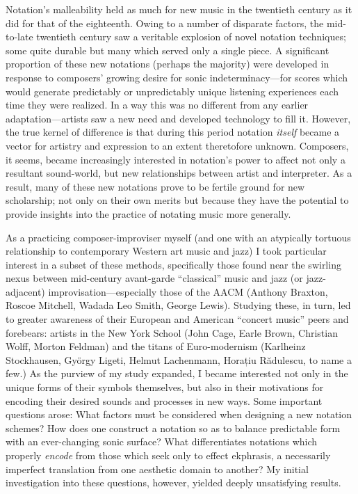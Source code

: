 Notation's malleability held as much for new music in the twentieth century as it did for that of the eighteenth. 
Owing to a number of disparate factors, the mid-to-late twentieth century saw a veritable explosion of novel notation techniques; some quite durable but many which served only a single piece.
A significant proportion of these new notations (perhaps the majority) were developed in response to composers' growing desire for sonic indeterminacy---for scores which would generate predictably or unpredictably unique listening experiences each time they were realized. 
In a way this was no different from any earlier adaptation---artists saw a new need and developed technology to fill it.
However, the true kernel of difference is that during this period notation \textit{itself} became a vector for artistry and expression to an extent theretofore unknown.
Composers, it seems, became increasingly interested in notation's power to affect not only a resultant sound-world, but new relationships between artist and interpreter.
As a result, many of these new notations prove to be fertile ground for new scholarship; not only on their own merits but because they have the potential to provide insights into the practice of notating music more generally. 

As a practicing composer-improviser myself (and one with an atypically tortuous relationship to contemporary Western art music and jazz) I took particular interest in a subset of these methods, specifically those found near the swirling nexus between mid-century avant-garde ``classical'' music and jazz (or jazz-adjacent) improvisation---especially those of the AACM (Anthony Braxton, Roscoe Mitchell, Wadada Leo Smith, George Lewis).
Studying these, in turn, led to greater awareness of their European and American ``concert music'' peers and forebears: artists in the New York School (John Cage, Earle Brown, Christian Wolff, Morton Feldman) and the titans of Euro-modernism (Karlheinz Stockhausen, Gy\"orgy Ligeti, Helmut Lachenmann, Horațiu R\u{a}dulescu, to name a few.)
As the purview of my study expanded, I became interested not only in the unique forms of their symbols themselves, but also in their motivations for encoding their desired sounds and processes in new ways.
Some important questions arose: What factors must be considered when designing a new notation schemes? 
How does one construct a notation so as to balance predictable form with an ever-changing sonic surface?
What differentiates notations which properly \textit{encode} from those which seek only to effect ekphrasis, a necessarily imperfect translation from one aesthetic domain to another? 
My initial investigation into these questions, however, yielded deeply unsatisfying results. 

